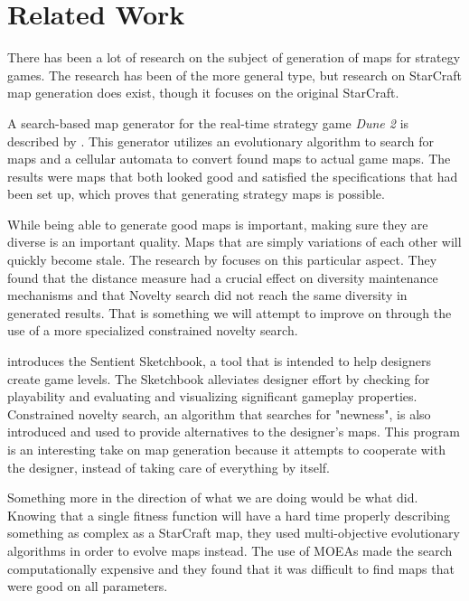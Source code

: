 \chapter{Related Work}
\label{relatedwork}

There has been a lot of research on the subject of generation of maps for strategy games. The research has been of the more general type, but research on StarCraft map generation does exist, though it focuses on the original StarCraft.

A search-based map generator for the real-time strategy game \textit{Dune 2} is described by \citeauthor{Mahlmann2012Spicing}\cite{Mahlmann2012Spicing}. This generator utilizes an evolutionary algorithm to search for maps and a cellular automata to convert found maps to actual game maps. The results were maps that both looked good and satisfied the specifications that had been set up, which proves that generating strategy maps is possible.

While being able to generate good maps is important, making sure they are diverse is an important quality. Maps that are simply variations of each other will quickly become stale. The research by \citeauthor{Preuss2014Searching}\cite{Preuss2014Searching} focuses on this particular aspect. They found that the distance measure had a crucial effect on diversity maintenance mechanisms and that Novelty search did not reach the same diversity in generated results. That is something we will attempt to improve on through the use of a more specialized constrained novelty search.

\citeauthor{Liapis2013sentient}\cite{Liapis2013sentient} introduces the Sentient Sketchbook, a tool that is intended to help designers create game levels. The Sketchbook alleviates designer effort by checking for playability and evaluating and visualizing significant gameplay properties. Constrained novelty search, an algorithm that searches for "newness",  is also introduced and used to provide alternatives to the designer's maps. This program is an interesting take on map generation because it attempts to cooperate with the designer, instead of taking care of everything by itself.

Something more in the direction of what we are doing would be what \citeauthor{Togelius2010Multiobjective}\cite{Togelius2010Multiobjective} did. Knowing that a single fitness function will have a hard time properly describing something as complex as a StarCraft map, they used multi-objective evolutionary algorithms in order to evolve maps instead. The use of MOEAs made the search computationally expensive and they found that it was difficult to find maps that were good on all parameters.

